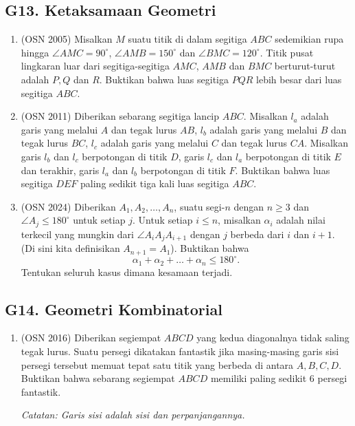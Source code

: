 \documentclass[12pt,a4paper]{article}
\begin{document}
\subsection{G13. Ketaksamaan Geometri}
\begin{enumerate}

\item (OSN 2005) Misalkan $M$ suatu titik di dalam segitiga $ABC$ sedemikian rupa hingga $\angle AMC = 90^{\circ}$, $\angle AMB = 150^{\circ}$ dan $\angle BMC = 120^{\circ}$. Titik pusat lingkaran luar dari segitiga-segitiga $AMC$, $AMB$ dan $BMC$ berturut-turut adalah $P, Q$ dan $R$. Buktikan bahwa luas segitiga $PQR$ lebih besar dari luas segitiga $ABC$.

\item (OSN 2011) Diberikan sebarang segitiga lancip $ABC$. Misalkan $l_{a}$ adalah garis yang melalui $A$ dan tegak lurus $AB$, $l_{b}$ adalah garis yang melalui $B$ dan tegak lurus $BC$, $l_{c}$ adalah garis yang melalui $C$ dan tegak lurus $CA$. Misalkan garis $l_{b}$ dan $l_{c}$ berpotongan di titik $D$, garis $l_{c}$ dan $l_{a}$ berpotongan di titik $E$ dan terakhir, garis $l_{a}$ dan $l_{b}$ berpotongan di titik $F$. Buktikan bahwa luas segitiga $DEF$ paling sedikit tiga kali luas segitiga $ABC$.

\item (OSN 2024) Diberikan $A_1, A_2, \dots, A_n$, suatu segi-$n$ dengan $n \ge 3$ dan $\angle A_j \le 180^\circ$ untuk setiap $j$. Untuk setiap $i \le n$, misalkan $\alpha_i$ adalah nilai terkecil yang mungkin dari $\angle A_i A_j A_{i+1}$ dengan $j$ berbeda dari $i$ dan $i + 1$. (Di sini kita definisikan $A_{n+1} = A_1$). Buktikan bahwa
$$\alpha_1 + \alpha_2 + \dots + \alpha_n \le 180^\circ.$$
Tentukan seluruh kasus dimana kesamaan terjadi.

\end{enumerate}

\subsection{G14. Geometri Kombinatorial}
\begin{enumerate}

\item (OSN 2016) Diberikan segiempat $ABCD$ yang kedua diagonalnya tidak saling tegak lurus. Suatu persegi dikatakan fantastik jika masing-masing garis sisi persegi tersebut memuat tepat satu titik yang berbeda di antara $A, B, C, D$. Buktikan bahwa sebarang segiempat $ABCD$ memiliki paling sedikit 6 persegi fantastik.

\textit{Catatan: Garis sisi adalah sisi dan perpanjangannya.}

\end{enumerate}
\end{document}
